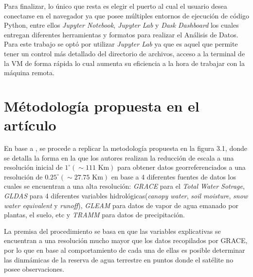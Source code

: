 Para finalizar, lo único que resta es elegir el puerto al cual el usuario desea conectarse en el navegador ya que posee múltiples entornos de ejecución de código Python, entre ellos \textit{Jupyter Notebook}, \textit{Jupyter Lab} y \textit{Dask Dashboard}
los cuales entregan diferentes herramientas y formatos para realizar el Análisis de Datos. Para este trabajo se optó por utilizar \textit{Jupyter Lab} ya que es aquel que permite tener un control más detallado del directorio de archivos, acceso a la terminal
de la VM de forma rápida lo cual aumenta su eficiencia a la hora de trabajar con la máquina remota. 
%
%
%
%
\section{Métodología propuesta en el artículo}
En base a \cite{11}, se procede a replicar la metodología propuesta en la figura 3.1, donde se detalla
la forma en la que los autores realizan la reducción de escala a una resolución inicial de $1^{\circ}(\sim 111 \text{ Km})$
para obtener datos georreferenciados a una resolución de $0.25^{\circ}(\sim 27.75 \text{ Km})$ en base a 4 diferentes fuentes de datos los cuales se encuentran a una alta resolución: 
\textit{GRACE} para el \textit{Total Water Sotrage}, \textit{GLDAS} para 4 diferentes variables hidrológicas(\textit{canopy water}, \textit{soil moisture}, 
\textit{snow water equivalent} y \textit{runoff}), \textit{GLEAM} para datos 
de vapor de agua emanado por plantas, el suelo, etc y \textit{TRAMM} para datos de precipitación.

La premisa del procedimiento se basa en que las variables explicativas se encuentran a una resolución mucho mayor que los datos recopilados por GRACE,
por lo que en base al comportamiento de cada una de ellas es posible determinar las dinmámicas de la reserva de agua terrestre en puntos donde el satélite no 
posee observaciones.

